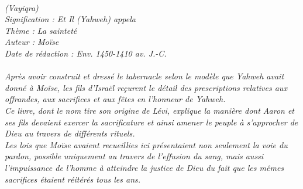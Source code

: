 \BFont
\noindent\hrulefill
{\footnotesize
\textit{
\bigskip
{\centering{}
\\(Vayiqra)
\\Signification : Et Il (Yahweh) appela 
\\Thème : La sainteté
\\Auteur : Moïse 
\\Date de rédaction : Env. 1450-1410 av. J.-C.\\}
}
\textit{
\\Après avoir construit et dressé le tabernacle selon le modèle que Yahweh avait donné à Moïse, les fils d’Israël reçurent le détail des prescriptions relatives aux offrandes, aux sacrifices et aux fêtes en l’honneur de Yahweh. 
\\Ce livre, dont le nom tire son origine de Lévi, explique la manière dont Aaron et ses fils devaient exercer la sacrificature et ainsi amener le peuple à s’approcher de Dieu au travers de différents rituels.
\\Les lois que Moïse avaient recueillies ici présentaient non seulement la voie du pardon, possible uniquement au travers de l’effusion du sang, mais aussi l’impuissance de l’homme à atteindre la justice de Dieu du fait que les mêmes sacrifices étaient réitérés tous les ans.\bigskip
}
}
\par\nobreak\noindent\hrulefill
